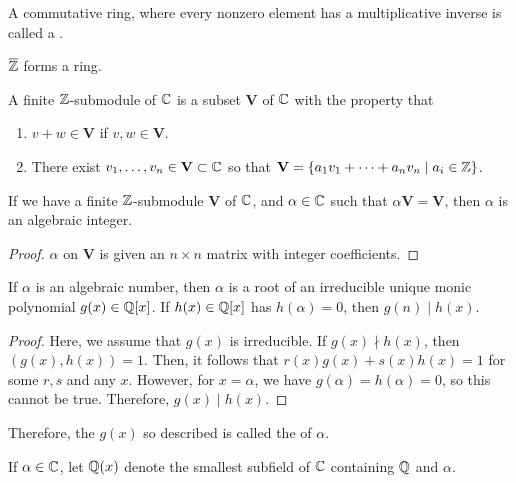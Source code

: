 \documentclass{article}
\begin{document}
\begin{definition}[Field]
	A commutative ring, where every nonzero element has a multiplicative inverse is called a .
\end{definition}

\begin{proposition}
	$\overline{\mathbb Z}$ forms a ring. 
\end{proposition}

\begin{definition}
	A finite $\mathbb Z$-submodule of $\mathbb C$ is a subset $\mathbf{V}$ of $\mathbb C$ with the property that 
	\begin{enumerate} 
		\item $v + w \in \mathbf{V}$ if $v, w \in \mathbf{V}$.
		\item There exist $v_1, \ldots, v_n \in \mathbf{V} \subset \mathbb C$ so that $\mathbf{V} = \{a_1v_1 + \cdots + a_nv_n \mid a_i \in \mathbb Z\}$.
	\end{enumerate}
\end{definition}

\begin{lemma}
	If we have a finite $\mathbb Z$-submodule $\mathbf{V}$ of $\mathbb C$, and $\alpha \in \mathbb C$ such that $\alpha \mathbf{V} = \mathbf{V}$, then $\alpha$ is an algebraic integer.
\end{lemma}

\begin{proof} 
	$\alpha$ on $\mathbf{V}$ is given an $n \times n$ matrix with integer coefficients.
\end{proof}

\begin{proposition}
	If $\alpha$ is an algebraic number, then $\alpha$ is a root of an irreducible unique monic polynomial $g(x) \in \mathbb Q[x]$. If $h(x) \in \mathbb Q[x]$ has $h(\alpha) = 0$, then $g(n) \mid h(x)$. 
\end{proposition}

\begin{proof}
	Here, we assume that $g(x)$ is irreducible. If $g(x) \nmid h(x)$, then $(g(x), h(x)) = 1$. Then, it follows that $r(x)g(x) + s(x)h(x) = 1$ for some $r, s$ and any $x$. However, for $x = \alpha$, we have $g(\alpha) = h(\alpha) = 0$, so this cannot be true. Therefore, $g(x) \mid h(x)$. 
\end{proof}

Therefore, the $g(x)$ so described is called the  of $\alpha$.

\begin{definition} 
	If $\alpha \in \mathbb C$, let $\mathbb Q(x)$ denote the smallest subfield of $\mathbb C$ containing $\mathbb Q$ and $\alpha$.
\end{definition}
\end{document}
